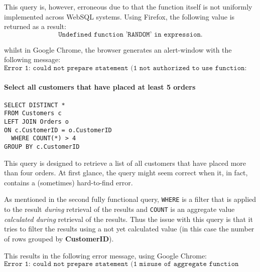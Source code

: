 This query is, however, erroneous due to that the function itself is not
uniformly implemented across WebSQL systems. Using Firefox, the following
value is returned as a result:
$$\texttt{Undefined function 'RANDOM' in expression.}$$

whilst in Google Chrome, the browser generates an alert-window with the
following message:
$$\texttt{Error 1: could not prepare statement (1 not authorized to use function: random)}$$

\paragraph{Select all customers that have placed at least 5 orders}

\begin{lstlisting}[label={sqlstatement4}]
SELECT DISTINCT *
FROM Customers c
LEFT JOIN Orders o
ON c.CustomerID = o.CustomerID
  WHERE COUNT(*) > 4
GROUP BY c.CustomerID
\end{lstlisting}

This query is designed to retrieve a list of all customers
that have placed more than four orders. At first glance, the
query might seem correct when it, in fact, contains a (sometimes)
hard-to-find error.

As mentioned in the second fully functional query, \texttt{WHERE}
is a filter that is applied to the result \textit{during} retrieval
of the results and \texttt{COUNT} is an aggregate value \textit{calculated during}
retrieval of the results. Thus the issue with this query is
that it tries to filter the results using a not yet calculated
value (in this case the number of rows grouped by \textbf{CustomerID}).

This results in the following error message, using Google Chrome:
$$\texttt{Error 1: could not prepare statement (1 misuse of aggregate function COUNT())}$$

